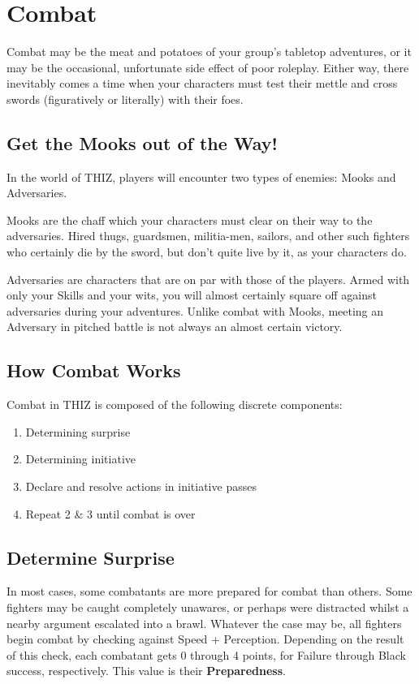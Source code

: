 \documentclass[oneside]{book}
\begin{document}
\chapter{Combat}
\begin{multicols}{2}
Combat may be the meat and potatoes of your group's tabletop adventures, or it may be the occasional, unfortunate side effect of poor roleplay. Either way, there inevitably comes a time when your characters must test their mettle and cross swords (figuratively or literally) with their foes. 

\section{Get the Mooks out of the Way!}
In the world of THIZ, players will encounter two types of enemies: Mooks and Adversaries. 

Mooks are the chaff which your characters must clear on their way to the adversaries. Hired thugs, guardsmen, militia-men, sailors, and other such fighters who certainly die by the sword, but don't quite live by it, as your characters do. 

Adversaries are characters that are on par with those of the players. Armed with only your Skills and your wits, you will almost certainly square off against adversaries during your adventures. Unlike combat with Mooks, meeting an Adversary in pitched battle is not always an almost certain victory. 

\section{How Combat Works}
Combat in THIZ is composed of the following discrete components:
\begin{enumerate}
  \setlength{\itemsep}{0cm}%
  \setlength{\parskip}{0cm}%
  \item Determining surprise
  \item Determining initiative
  \item Declare and resolve actions in initiative passes
  \item Repeat 2 \& 3 until combat is over
\end{enumerate}

\section{Determine Surprise}
In most cases, some combatants are more prepared for combat than others. Some fighters may be caught completely unawares, or perhaps were distracted whilst a nearby argument escalated into a brawl. Whatever the case may be, all fighters begin combat by checking against Speed + Perception. Depending on the result of this check, each combatant gets 0 through 4 points, for Failure through Black success, respectively. This value is their \textbf{Preparedness}.  


\end{multicols}
\end{document}
